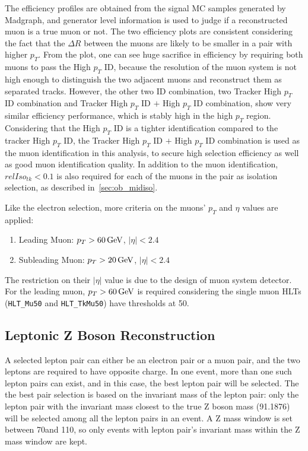 \vspace{0.3cm}
The efficiency profiles are obtained from the signal MC samples generated by Madgraph, and generator level information is used to judge if a reconstructed muon is a true muon or not. The two efficiency plots are consistent considering the fact that the $\Delta R$ between the muons are likely to be smaller in a pair with higher $p_T$. From the plot, one can see huge sacrifice in efficiency by requiring both muons to pass the High $p_T$ ID, because the resolution of the muon system is not high enough to distinguish the two adjacent muons and reconstruct them as separated tracks. However, the other two ID combination, two Tracker High $p_T$ ID combination and Tracker High $p_T$ ID $+$ High $p_T$ ID combination, show very similar efficiency performance, which is stably high in the high $p_T$ region. Considering that the High $p_T$ ID is a tighter identification compared to the tracker High $p_T$ ID, the Tracker High $p_T$ ID $+$ High $p_T$ ID combination is used as the muon identification in this analysis, to secure high selection efficiency as well as good muon identification quality. In addition to the muon identification, $relIso_{tk}<0.1$ is also required for each of the muons in the pair as isolation selection, as described in~\ref{sec:ob_midiso}.

\vspace{0.3cm}
Like the electron selection, more criteria on the muons' $p_T$ and $\eta$ values are applied:
\begin{enumerate}
\item Leading Muon: $p_T >60\,\text{Ge\hspace{-.08em}V}$, $|\eta|<2.4$
\item Subleading Muon: $p_T >20\,\text{Ge\hspace{-.08em}V}$, $|\eta|<2.4$
\end{enumerate}

The restriction on their $|\eta|$ value is due to the design of muon system detector. For the leading muon, $p_T >60\,\text{Ge\hspace{-.08em}V}$ is required considering the single muon HLTs (\texttt{HLT\_Mu50} and \texttt{HLT\_TkMu50}) have thresholds at 50\GeV.

\subsection{Leptonic Z Boson Reconstruction}
A selected lepton pair can either be an electron pair or a muon pair, and the two leptons are required to have opposite charge. In one event, more than one such lepton pairs can exist, and in this case, the best lepton pair will be selected. The the best pair selection is based on the invariant mass of the lepton pair: only the lepton pair with the invariant mass closest to the true Z boson mass (91.1876\GeV) will be selected among all the lepton pairs in an event. A Z mass window is set between 70\GeV and 110\GeV, so only events with lepton pair's invariant mass within the Z mass window are kept.

